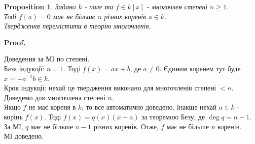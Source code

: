 \documentclass[a4paper, 14pt]{extarticle}
\makeatletter
\theoremstyle{theoremdd}
\theoremstyle{theoremdd}
\theoremstyle{theoremdd}
\theoremstyle{theoremdd}
\theoremstyle{theoremdd}
\newtheorem{proposition}[theorem]{Proposition}
\theoremstyle{theoremdd}
\theoremstyle{theoremdd}
\theoremstyle{theoremdd}
\def\qed{$\blacksquare$}
\renewenvironment{proof}[1][Proof.\\]{\par
\pushQED{\hfill \qed}%
\normalfont \topsep6\p@\@plus6\p@\relax
\trivlist
\item\relax
{\bfseries
#1\@addpunct{.}}\hspace\labelsep\ignorespaces
}{%
\popQED\endtrivlist\@endpefalse
}
\makeatother
\begin{document}
\begin{proposition}
Задано $k$ - поле та $f \in k[x]$ - многочлен степені $n \geq 1$.\\
Тоді $f(a) = 0$ має не більше $n$ різних коренів $a \in k$.\\
\textit{Твердження перемістити в теорію многочленів.}
\end{proposition}

\begin{proof}
Доведення за МІ по степені.\\
База індукції: $n = 1$. Тоді $f(x) = ax+b$, де $a \neq 0$. Єдиним коренем тут буде $x = -a^{-1}b \in k$.\\
Крок індукції: нехай це твердження виконано для многочленів степені $< n$. Доведемо для многочлена степені $n$.\\
Якщо $f$ не має кореня в $k$, то все автоматично доведено. Інакше нехай $a \in k$ - корінь $f(x)$. Тоді $f(x) = q(x)(x-a)$ за теоремою Безу, де $\deg q = n-1$. За МІ, $q$ має не більше $n-1$ різних коренів. Отже, $f$ має не більше $n$ коренів.\\
МІ доведено.
\end{proof}
\end{document}
